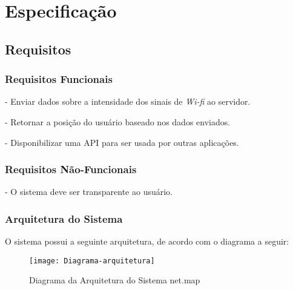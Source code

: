 
\chapter{Especificação}\label{chp:espec}
\section{Requisitos}\label{sec:req}

\subsection{Requisitos Funcionais}
- Enviar dados sobre a intensidade dos sinais de \textit{Wi-fi} ao servidor. \par
- Retornar a posição do usuário baseado nos dados enviados.\par
- Disponibilizar uma API para ser usada por outras aplicações.\par


\subsection{Requisitos Não-Funcionais}

- O sistema deve ser transparente ao usuário.\par


\subsection{Arquitetura do Sistema}


O sistema possui a seguinte arquitetura, de acordo com o diagrama a seguir:


\begin{figure}[H]
	\centering
	\caption{Diagrama da Arquitetura do Sistema net.map}
  \texttt{[image: Diagrama-arquitetura]}
\label{fig:diagramaarq}

\end{figure}



